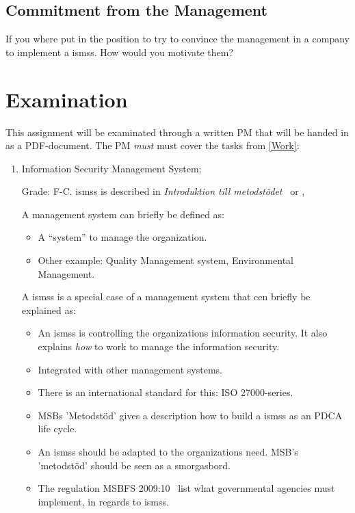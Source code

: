 \documentclass[a4paper]{llncs}
\begin{document}
\subsection{Commitment from the Management}
If you where put in the position to try to convince the management in a company
to implement a \acp{isms}. How would you motivate them?

\section{Examination}
\label{sec:examination}

This assignment will be examinated through a written PM that will be handed in
as a PDF-document.
The PM \emph{must} must cover the tasks from \cref{Work}:

\begin{enumerate}
  \item Information Security Management System;
    \begin{solution}
      Grade: F-C.
      \acp{isms} is described in \emph{Introduktion till 
        metodstödet}~\cite{MSB2011itm} or \cite[chap. 3]{iso27000},

      A management system can briefly be defined as:
      \begin{itemize}
        \item A \enquote{system} to manage the organization.
        \item Other example: Quality Management system, Environmental Management.
      \end{itemize}

      A \acp{isms} is a special case of a management system that cen briefly be
      explained as:
      \begin{itemize}
        \item An \acp{isms} is controlling the organizations information
          security. It also explains \emph{how} to work to manage the
          information security.

        \item Integrated with other management systems.
        \item There is an international standard for this: ISO 27000-series.
        \item MSBs 'Metodstöd' gives a description how to build a \acp{isms} as
          an PDCA life cycle.
        \item An \acp{isms} should be adapted to the organizations need. MSB's
          'metodstöd' should be seen as a smorgasbord.
        \item The regulation MSBFS 2009:10~\cite{MSBFS2009:10} list what
          governmental agencies must implement, in regards to \acp{isms}.
      \end{itemize}
    \end{solution}


\end{enumerate}
\end{document}
